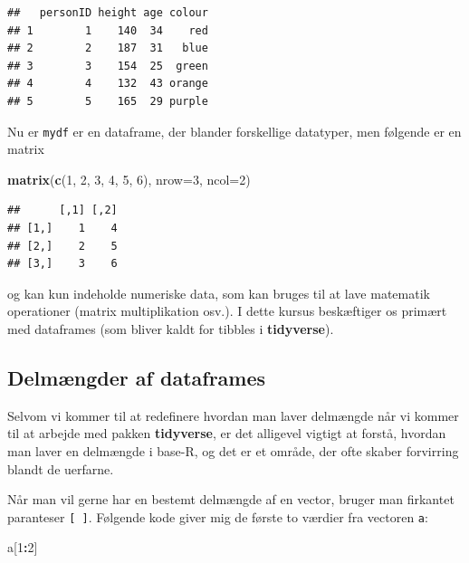 \documentclass[
]{book}
\newenvironment{Shaded}{\begin{snugshade}}{\end{snugshade}}
\newcommand{\AttributeTok}[1]{\textcolor[rgb]{0.13,0.29,0.53}{#1}}
\newcommand{\DecValTok}[1]{\textcolor[rgb]{0.00,0.00,0.81}{#1}}
\newcommand{\FunctionTok}[1]{\textcolor[rgb]{0.13,0.29,0.53}{\textbf{#1}}}
\newcommand{\NormalTok}[1]{#1}
\newcommand{\SpecialCharTok}[1]{\textcolor[rgb]{0.81,0.36,0.00}{\textbf{#1}}}
\theoremstyle{definition}
\theoremstyle{definition}
\theoremstyle{definition}
\theoremstyle{definition}
\theoremstyle{remark}
\begin{document}
\begin{verbatim}
##   personID height age colour
## 1        1    140  34    red
## 2        2    187  31   blue
## 3        3    154  25  green
## 4        4    132  43 orange
## 5        5    165  29 purple
\end{verbatim}

Nu er \texttt{mydf} er en dataframe, der blander forskellige datatyper, men følgende er en matrix

\begin{Shaded}
\begin{Highlighting}[]
\FunctionTok{matrix}\NormalTok{(}\FunctionTok{c}\NormalTok{(}\DecValTok{1}\NormalTok{, }\DecValTok{2}\NormalTok{, }\DecValTok{3}\NormalTok{, }\DecValTok{4}\NormalTok{, }\DecValTok{5}\NormalTok{, }\DecValTok{6}\NormalTok{), }
    \AttributeTok{nrow=}\DecValTok{3}\NormalTok{,}
    \AttributeTok{ncol=}\DecValTok{2}\NormalTok{)}
\end{Highlighting}
\end{Shaded}

\begin{verbatim}
##      [,1] [,2]
## [1,]    1    4
## [2,]    2    5
## [3,]    3    6
\end{verbatim}

og kan kun indeholde numeriske data, som kan bruges til at lave matematik operationer (matrix multiplikation osv.). I dette kursus beskæftiger os primært med dataframes (som bliver kaldt for tibbles i \textbf{tidyverse}).

\subsection{Delmængder af dataframes}\label{delmuxe6ngder-af-dataframes}

Selvom vi kommer til at redefinere hvordan man laver delmængde når vi kommer til at arbejde med pakken \textbf{tidyverse}, er det alligevel vigtigt at forstå, hvordan man laver en delmængde i base-R, og det er et område, der ofte skaber forvirring blandt de uerfarne.

Når man vil gerne har en bestemt delmængde af en vector, bruger man firkantet paranteser \texttt{{[}\ {]}}. Følgende kode giver mig de første to værdier fra vectoren \texttt{a}:

\begin{Shaded}
\begin{Highlighting}[]
\NormalTok{a[}\DecValTok{1}\SpecialCharTok{:}\DecValTok{2}\NormalTok{]}
\end{Highlighting}
\end{Shaded}
\end{document}
